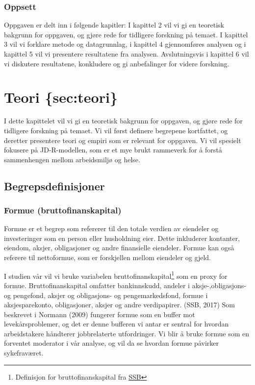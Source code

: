 \documentclass[
  12pt,
  a4paper,
  DIV=11,
  numbers=noendperiod]{scrartcl}
\begin{document}
\subsubsection{Oppsett}\label{oppsett}

Oppgaven er delt inn i følgende kapitler: I kapittel 2 vil vi gi en
teoretisk bakgrunn for oppgaven, og gjøre rede for tidligere forskning
på temaet. I kapittel 3 vil vi forklare metode og datagrunnlag, i
kapittel 4 gjennomføres analysen og i kapittel 5 vil vi presentere
resultatene fra analysen. Avslutningsvis i kapittel 6 vil vi diskutere
resultatene, konkludere og gi anbefalinger for videre forskning.

\section{Teori \{sec:teori\}}\label{teori-secteori}

I dette kapittelet vil vi gi en teoretisk bakgrunn for oppgaven, og
gjøre rede for tidligere forskning på temaet. Vi vil først definere
begrepene kortfattet, og deretter presentere teori og empiri som er
relevant for oppgaven. Vi vil spesielt fokusere på JD-R-modellen, som er
et mye brukt rammeverk for å forstå sammenhengen mellom arbeidsmiljø og
helse.

\subsection{Begrepsdefinisjoner}\label{begrepsdefinisjoner}

\subsubsection{Formue
(bruttofinanskapital)}\label{formue-bruttofinanskapital}

Formue er et begrep som refererer til den totale verdien av eiendeler og
investeringer som en person eller husholdning eier. Dette inkluderer
kontanter, eiendom, aksjer, obligasjoner og andre finansielle eiendeler.
Formue kan også referere til nettoformue, som er forskjellen mellom
eiendeler og gjeld.

I studien vår vil vi bruke variabelen bruttofinanskapital\footnote{Definisjon
  for bruttofinanskapital fra
  \href{https://www.ssb.no/a/metadata/conceptvariable/vardok/3449/nb}{SSB}}
som en proxy for formue. Bruttofinanskapital omfatter bankinnskudd,
andeler i aksje-,obligasjons- og pengefond, aksjer og obligasjons- og
pengemarkedsfond, formue i aksjesparekonto, obligasjoner, aksjer og
andre verdipapirer. (SSB, 2017) Som beskrevet i Normann (2009) fungerer
formue som en buffer mot levekårsproblemer, og det er denne bufferen vi
antar er sentral for hvordan arbeidstakere håndterer jobbrelaterte
utfordringer. Vi blir å bruke formue som en forventet moderator i vår
analyse, og vil da se hvordan formue påvirker sykefraværet.
\end{document}
